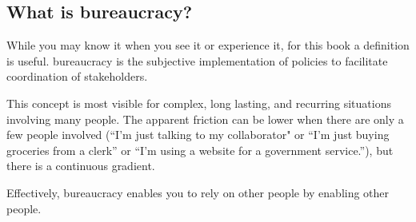 \subsection{What is bureaucracy?}
While you may know it when you see it or experience it, for this book a definition is useful. 
\gls{bureaucracy} is the subjective implementation of policies to facilitate coordination of stakeholders. 

This concept is most visible for complex, long lasting, and recurring situations involving many people. The apparent friction can be lower when there are only a few people involved (``I'm just talking to my collaborator" or ``I'm just buying groceries from a clerk'' or ``I'm using a website for a government service.''), but there is a continuous gradient. 

Effectively, bureaucracy enables you to rely on other people by enabling other people. 